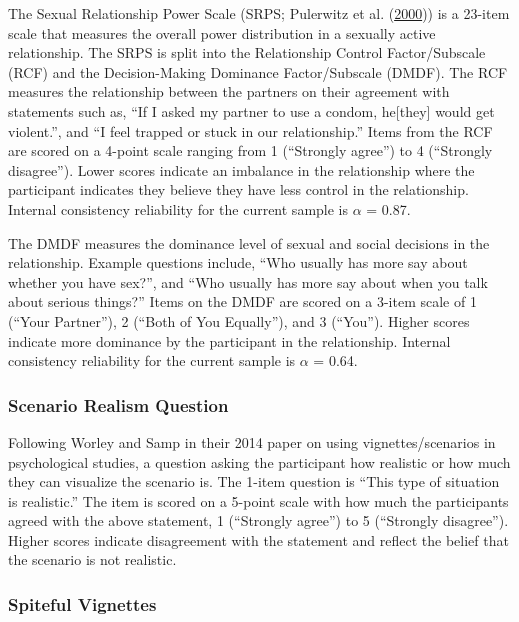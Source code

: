 \documentclass[
  donotrepeattitle,doc, 12pt, a4paper,floatsintext]{apa7}
\begin{document}
The Sexual Relationship Power Scale (SRPS; Pulerwitz et al. (\protect\hyperlink{ref-pulerwitz2000}{2000})) is a 23-item scale that measures the overall power distribution in a sexually active relationship. The SRPS is split into the Relationship Control Factor/Subscale (RCF) and the Decision-Making Dominance Factor/Subscale (DMDF). The RCF measures the relationship between the partners on their agreement with statements such as, ``If I asked my partner to use a condom, he{[}they{]} would get violent.'', and ``I feel trapped or stuck in our relationship.'' Items from the RCF are scored on a 4-point scale ranging from 1 (``Strongly agree'') to 4 (``Strongly disagree''). Lower scores indicate an imbalance in the relationship where the participant indicates they believe they have less control in the relationship. Internal consistency reliability for the current sample is \(\alpha\) = 0.87.

The DMDF measures the dominance level of sexual and social decisions in the relationship. Example questions include, ``Who usually has more say about whether you have sex?'', and ``Who usually has more say about when you talk about serious things?'' Items on the DMDF are scored on a 3-item scale of 1 (``Your Partner''), 2 (``Both of You Equally''), and 3 (``You''). Higher scores indicate more dominance by the participant in the relationship. Internal consistency reliability for the current sample is \(\alpha\) = 0.64.

\hypertarget{scenario-realism-question}{%
\subsubsection{Scenario Realism Question}\label{scenario-realism-question}}

Following Worley and Samp in their 2014 paper on using vignettes/scenarios in psychological studies, a question asking the participant how realistic or how much they can visualize the scenario is. The 1-item question is ``This type of situation is realistic.'' The item is scored on a 5-point scale with how much the participants agreed with the above statement, 1 (``Strongly agree'') to 5 (``Strongly disagree''). Higher scores indicate disagreement with the statement and reflect the belief that the scenario is not realistic.

\hypertarget{spiteful-vignettes}{%
\subsubsection{Spiteful Vignettes}\label{spiteful-vignettes}}
\end{document}
